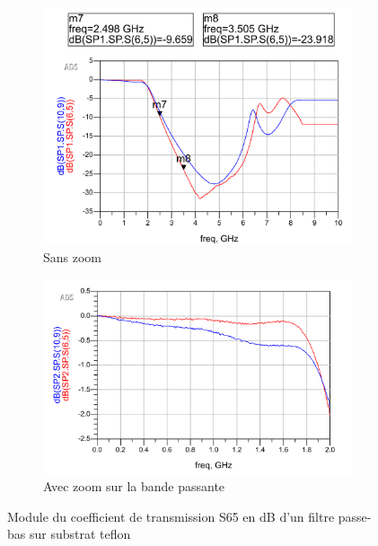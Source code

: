\documentclass[french]{article}
\begin{document}
\begin{figure}[H]
	\centering
	\begin{subfigure}[b]{0.49\textwidth}
		\includegraphics[width=\textwidth]{photo/passe_bas_vic/simu_passe_bas_reel_tche.PNG}
		\caption{Sans zoom}
		\label{fig:simu_passe_bas_reel_tche_teflon}
	\end{subfigure}
	\begin{subfigure}[b]{0.49\textwidth}
		\includegraphics[width=\textwidth]{photo/passe_bas_vic/simu_zoom_passe_bas_reel_tche.PNG}
		\caption{Avec zoom sur la bande passante}
		\label{fig:simu_zoom_passe_bas_reel_tche_teflon}
	\end{subfigure}
	\caption{Module du coefficient de transmission S65 en dB d'un filtre passe-bas sur substrat teflon}
\end{figure}
\end{document}
